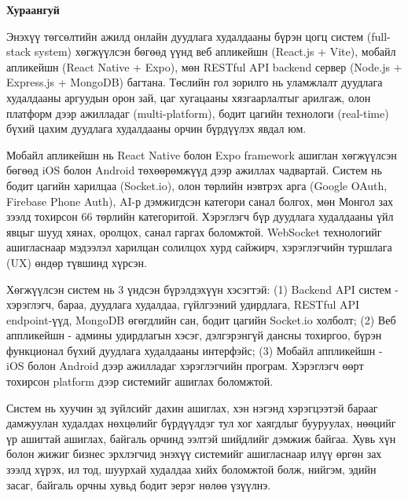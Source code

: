 

\begin{center}
{\scshape\Large \univname\par} %
{\scshape\large \facname\par}\vspace{0.5cm} %
{\huge\textbf{{Хураангуй}} \par}
\bigskip
{\Large{\ttitle} \par} %
\bigskip

{\normalsize \shortname \par} %
\addressname
\end{center}

\bigskip

Энэхүү төгсөлтийн ажилд онлайн дуудлага худалдааны бүрэн цогц систем (full-stack system) хөгжүүлсэн бөгөөд үүнд веб апликейшн (React.js + Vite), мобайл апликейшн (React Native + Expo), мөн RESTful API backend сервер (Node.js + Express.js + MongoDB) багтана. Төслийн гол зорилго нь уламжлалт дуудлага худалдааны аргуудын орон зай, цаг хугацааны хязгаарлалтыг арилгаж, олон платформ дээр ажилладаг (multi-platform), бодит цагийн технологи (real-time) бүхий цахим дуудлага худалдааны орчин бүрдүүлэх явдал юм.

Мобайл апликейшн нь React Native болон Expo framework ашиглан хөгжүүлсэн бөгөөд iOS болон Android төхөөрөмжүүд дээр ажиллах чадвартай. Систем нь бодит цагийн харилцаа (Socket.io), олон төрлийн нэвтрэх арга (Google OAuth, Firebase Phone Auth), AI-р дэмжигдсэн категори санал болгох, мөн Монгол зах зээлд тохирсон 66 төрлийн категоритой. Хэрэглэгч бүр дуудлага худалдааны үйл явцыг шууд хянах, оролцох, санал гаргах боломжтой. WebSocket технологийг ашигласнаар мэдээлэл харилцан солилцох хурд сайжирч, хэрэглэгчийн туршлага (UX) өндөр түвшинд хүрсэн.

Хөгжүүлсэн систем нь 3 үндсэн бүрэлдэхүүн хэсэгтэй: (1) Backend API систем - хэрэглэгч, бараа, дуудлага худалдаа, гүйлгээний удирдлага, RESTful API endpoint-үүд, MongoDB өгөгдлийн сан, бодит цагийн Socket.io холболт; (2) Веб аппликейшн - админы удирдлагын хэсэг, дэлгэрэнгүй дансны тохиргоо, бүрэн функционал бүхий дуудлага худалдааны интерфэйс; (3) Мобайл аппликейшн - iOS болон Android дээр ажилладаг хэрэглэгчийн програм. Хэрэглэгч өөрт тохирсон platform дээр системийг ашиглах боломжтой.

Систем нь хуучин эд зүйлсийг дахин ашиглах, хэн нэгэнд хэрэгцээтэй барааг дамжуулан худалдах нөхцөлийг бүрдүүлдэг тул хог хаягдлыг бууруулах, нөөцийг үр ашигтай ашиглах, байгаль орчинд ээлтэй шийдлийг дэмжиж байгаа. Хувь хүн болон жижиг бизнес эрхлэгчид энэхүү системийг ашигласнаар илүү өргөн зах зээлд хүрэх, ил тод, шуурхай худалдаа хийх боломжтой болж, нийгэм, эдийн засаг, байгаль орчны хувьд бодит эерэг нөлөө үзүүлнэ.





